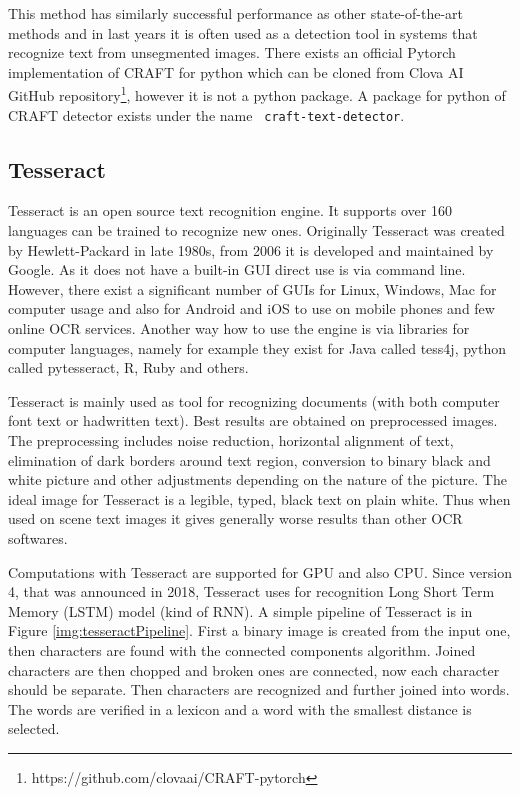 This method has similarly successful performance as other state-of-the-art methods and in last years it is often used as a detection tool in systems that recognize text from unsegmented images. There exists an official Pytorch implementation of CRAFT for python which can be cloned from Clova AI GitHub repository\footnote{https://github.com/clovaai/CRAFT-pytorch}, however it is not a python package. A package for python of CRAFT detector exists under the name \texttt{
craft-text-detector}.

\subsection{Tesseract}

Tesseract is an open source text recognition engine. It supports over 160 languages can be trained to recognize new ones. Originally Tesseract was created by Hewlett-Packard in late 1980s, from 2006 it is developed and maintained by Google. As it does not have a built-in GUI direct use is via command line. However, there exist a significant number of GUIs for Linux, Windows, Mac for computer usage and also for Android and iOS to use on mobile phones and few online OCR services. Another way how to use the engine is via libraries for computer languages, namely for example they exist for Java called tess4j, python called pytesseract, R, Ruby and others. \cite{tesseract1}

Tesseract is mainly used as tool for recognizing documents (with both computer font text or hadwritten text). Best results are obtained on preprocessed images. The preprocessing includes noise reduction, horizontal alignment of text, elimination of dark borders around text region, conversion to binary black and white picture and other adjustments depending on the nature of the picture. The ideal image for Tesseract is a legible, typed, black text on plain white. Thus when used on scene text images it gives generally worse results than other OCR softwares. 

Computations with Tesseract are supported for GPU and also CPU. Since version 4, that was announced in 2018, Tesseract uses for recognition Long Short Term Memory (LSTM) model (kind of RNN). A simple pipeline of Tesseract is in Figure \ref*{img:tesseractPipeline}. First a binary image is created from the input one, then characters are found with the connected components algorithm. Joined characters are then chopped and broken ones are connected, now each character should be separate. Then characters are recognized and further joined into words. The words are verified in a lexicon and a word with the smallest distance is selected.\cite{tesseract2}

